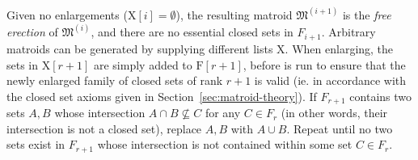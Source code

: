 

Given no enlargements ($\mathrm{X}[i] = \emptyset$), the resulting matroid $\mathfrak{M}^{(i+1)}$ is the \textit{free erection} of $\mathfrak{M}^{(i)}$, and there are no essential closed sets in $F_{i+1}$. Arbitrary matroids can be generated by supplying different lists $\mathrm{X}$. When enlarging, the sets in $\mathrm{X}[r+1]$ are simply added to $\mathrm{F}[r+1]$, before  is run to ensure that the newly enlarged family of closed sets of rank $r+1$ is valid (ie. in accordance with the closed set axioms given in Section~\ref{sec:matroid-theory}). If $F_{r+1}$ contains two sets $A,B$ whose intersection $A \cap B \not \subseteq C$ for any $C \in F_{r}$ (in other words, their intersection is not a closed set), replace $A,B$ with $A \cup B$. Repeat until no two sets exist in $F_{r+1}$ whose intersection is not contained within some set $C \in F_{r}$.

